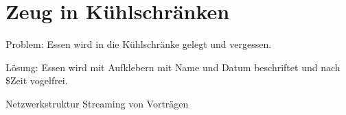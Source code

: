 \documentclass{scrartcl}
\begin{document}
\section{Zeug in Kühlschränken}

Problem: Essen wird in die Kühlschränke gelegt und vergessen.

Lösung: Essen wird mit Aufklebern mit Name und Datum beschriftet und nach \$Zeit vogelfrei.



Netzwerkstruktur
Streaming von Vorträgen
\end{document}
